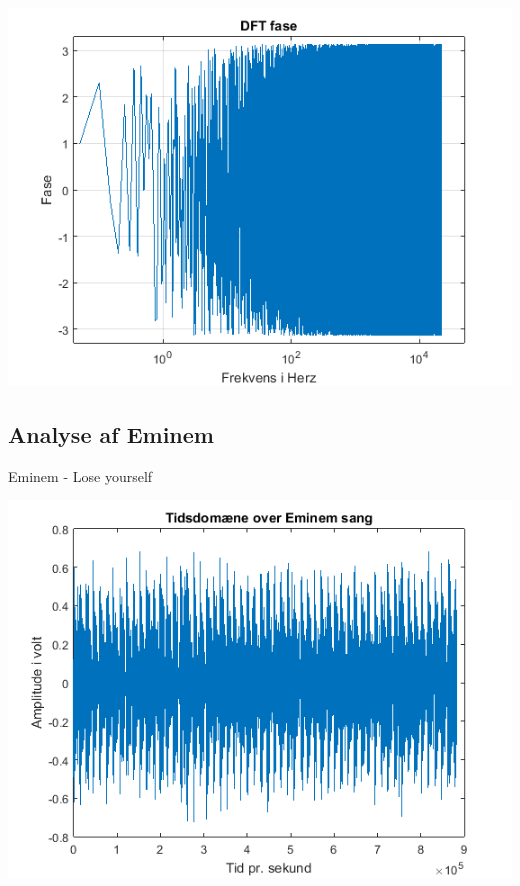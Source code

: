 \documentclass[12pt, letterpaper]{article}
\begin{document}
\begin{center}
\includegraphics[width=\textwidth]{billeder/weekndfase}
\end{center}

\subsection{Analyse af Eminem}
Eminem - Lose yourself

\begin{center}
\includegraphics[width=\textwidth]{billeder/eminemtid}
\end{center}
\end{document}
